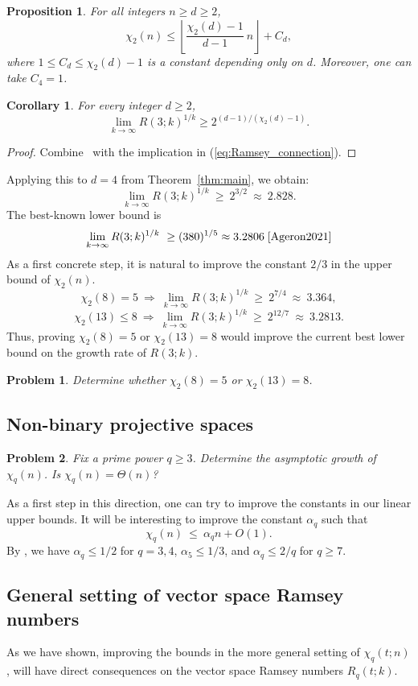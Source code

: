 \documentclass[11pt]{article}
\theoremstyle{plain}
\newtheorem{corollary}{Corollary}
\newtheorem{proposition}{Proposition}
\newtheorem{problem}{Problem}
\begin{document}
\begin{proposition}\label{prop:main_generalized}
 For all integers $n\geq d\geq 2$,
    $$\chi_2(n)\leq \left\lfloor \frac{\chi_2(d)-1}{d-1} \ n \right \rfloor +C_d, $$
    where $1\leq C_d \leq \chi_2(d)-1$ is a constant depending only on $d$. Moreover, one can take $C_4=1$.
\end{proposition}

\begin{corollary}
For every integer $d\geq 2$,
$$\lim_{k \rightarrow \infty} R(3;k)^{1/k} \geq 2^{(d-1)/(\chi_2(d)-1)}.$$
\end{corollary}
\begin{proof}
Combine~ with the implication in (\ref{eq:Ramsey_connection}).
\end{proof}
Applying this to $d = 4$ from Theorem~\ref{thm:main}, we obtain:
\[
\lim_{k\to\infty} R(3;k)^{1/k}\ \ge\ 2^{3/2}\ \approx\ 2.828.
\]
The best-known lower bound is
\[
\lim_{k\to\infty} R(3;k)^{1/k}\ \geq (380)^{1/5} \approx 3.2806 \; \cite{Ageron2021}
\]
As a first concrete step, it is natural to improve the constant $2/3$ in the upper bound of $\chi_2(n)$.
\[
\chi_2(8)= 5  \ \Rightarrow\ \lim_{k\to\infty} R(3;k)^{1/k}\ \ge\ 2^{7/4}\ \approx\ 3.364,
\]
\[
\chi_2(13)\le 8 \ \Rightarrow\ \lim_{k\to\infty} R(3;k)^{1/k}\ \ge\ 2^{12/7}\ \approx\ 3.2813.
\]
Thus, proving $\chi_2(8)=5$ or $\chi_2(13)=8$ would improve the current best lower bound on the growth rate of $R(3;k)$.
\begin{problem}
    Determine whether $\chi_2(8)=5$ or $\chi_2(13)=8$.
\end{problem}

\subsection{Non-binary projective spaces}\label{sec:open-nonbinary}
\begin{problem}
Fix a prime power $q\ge 3$.
Determine the asymptotic growth of $\chi_q(n)$.
Is $\chi_q(n)=\Theta(n)$?
\end{problem}

As a first step in this direction, one can try to improve the constants in our linear upper bounds.
It will be interesting to improve the constant $\alpha_q$ such that
\[
\chi_q(n)\ \le\ \alpha_q n + O(1).
\]
By , we have $\alpha_q\le 1/2$ for $q=3,4$, $\alpha_5\le 1/3$, and $\alpha_q\le 2/q$ for $q\ge7$.

\subsection{General setting of vector space Ramsey numbers}
As we have shown, improving the bounds in the more general setting of $\chi_q(t; n)$, will have direct consequences on the vector space Ramsey numbers $R_q(t; k)$. 
\end{document}
